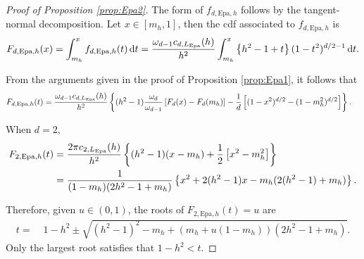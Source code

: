 \documentclass[oneside,11pt]{article}
\begin{document}
\begin{proof}[Proof of Proposition \ref{prop:Epa2}]
The form of $f_{d,\mathrm{Epa},h}$ follows by the tangent-normal decomposition. Let $x\in[m_h,1]$, then the cdf associated to $f_{d,\mathrm{Epa},h}$ is
\begin{align*}
    F_{d,\mathrm{Epa},h}(x)=\int_{m_h}^x f_{d,\mathrm{Epa},h}(t)\,\mathrm{d} t
    =\frac{\omega_{d-1} c_{d,L_\mathrm{Epa}}(h)}{h^2}\int_{m_h}^x \left\{h^2-1+t\right\}(1-t^2)^{d/2-1}\,\mathrm{d} t.
\end{align*}

From the arguments given in the proof of Proposition \ref{prop:Epa1}, it follows that
\begin{align*}
    F_{d,\mathrm{Epa},h}(t)%
    =&\;\frac{\om{d-1} c_{d,L_\mathrm{Epa}}(h)}{h^2}\lrb{(h^2-1)\frac{\om{d}}{\om{d-1}}\lrc{F_d(x)-F_d(m_h)}-\frac{1}{d}\lrc{(1-x^2)^{d/2} - (1-m_h^2)^{d/2}}}.
\end{align*}

When $d=2$,
\begin{align*}
    F_{2,\mathrm{Epa},h}(t)%
    =&\;\frac{2\pi c_{2,L_\mathrm{Epa}}(h)}{h^2}\lrb{(h^2-1)(x-m_h)+\frac{1}{2}\lrc{x^2-m_h^2}}\\
    =&\;\frac{1}{(1-m_h)(2h^2-1+m_h)}\lrb{x^2+2(h^2-1)x-m_h(2(h^2-1)+m_h)}.
\end{align*}

Therefore, given $u\in(0,1)$, the roots of $F_{2,\mathrm{Epa},h}(t)=u$ are
\begin{align*}
    t%
    =&\;1-h^2\pm\sqrt{(h^2-1)^2-m_h+(m_h+u(1-m_h))(2h^2-1+m_h)}.
\end{align*}
Only the largest root satisfies that $1-h^2<t$.
\end{proof}
\end{document}

